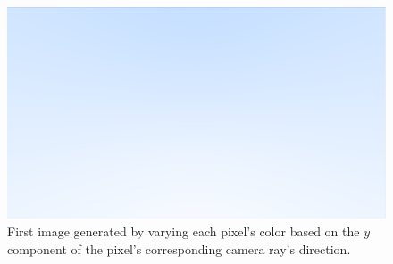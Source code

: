 \begin{figure}[H]
    \centering
    \includegraphics[scale=0.4]{figures/FirstImage.png}
    \caption{First image generated by varying each pixel's color based on the $y$ component of the pixel's corresponding camera ray's direction.}
    \label{fig:first_image}
\end{figure}